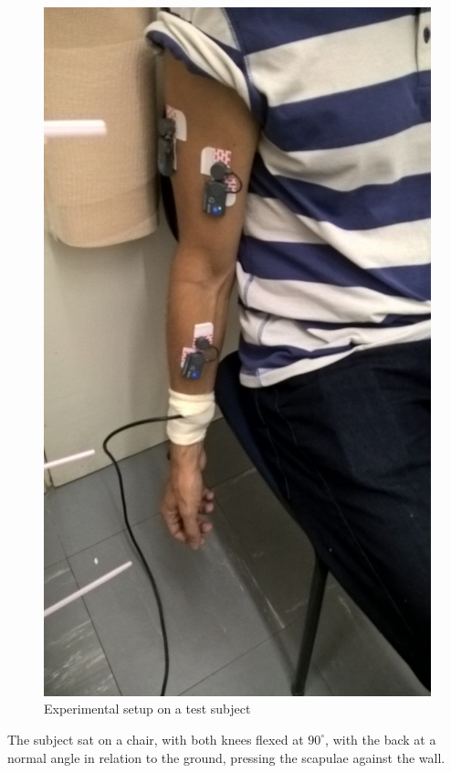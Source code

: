 \documentclass[letterpaper, 10 pt, conference]{ieeeconf}  %
\begin{document}
\begin{figure}[thpb]
\vspace{3mm}
      \centering
      \includegraphics[scale=0.32]{Images/Experiment_Image.jpg}
      \caption{Experimental setup on a test subject}
      \label{Experimental Setup}
   \end{figure}

The subject sat on a chair, with both knees flexed at \(90^{\circ}\), with the back at a normal angle in relation to the ground, pressing the scapulae against the wall.
\end{document}
